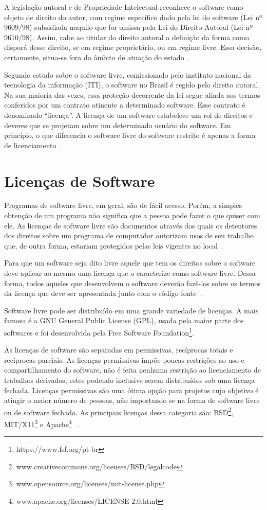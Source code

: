 A legislação autoral e de Propriedade Intelectual reconhece o software como objeto 
de direito do autor, com regime específico dado pela lei do software (Lei nº 9609/98)
subsidiada naquilo que for omissa pela Lei do Direito Autoral (Lei nº 9610/98).
%
Assim, cabe ao titular do direito autoral a definição da forma como disporá desse
direito, se em regime proprietário, ou em regime livre. Essa decisão, certamente,
situa-se fora do âmbito de atuação do estado~\cite{junior2005software}.

Segundo estudo sobre o software livre, comissionado pelo instituto nacional da 
tecnologia da informação (ITI), o software no Brasil é regido pelo direito autoral. 
Na sua maioria das vezes, essa proteção decorrente da lei segue aliada aos termos 
conferidos por um contrato atinente a determinado software. Esse contrato é 
denominado ``licença''. A licença de um software estabelece um rol de direitos e 
deveres que se projetam sobre um determinado usuário do software. Em princípio, 
o que diferencia o software livre do software restrito é apenas a forma de
licenciamento~\cite{kon2012software}.


\section{Licenças de Software}

Programas de software livre, em geral, são de fácil acesso. Porém, a simples obtenção
de um programa não significa que a pessoa pode fazer o que quiser com ele. As licenças
de software livre são documentos através dos quais os detentores dos direitos sobre um
programa de computador autorizam usos de seu trabalho que, de outra forma, estariam
protegidos pelas leis vigentes no local~\cite{sabino2009licenccas}.

Para que um software seja dito livre aquele que tem os direitos sobre o software
deve aplicar ao mesmo uma licença que o caracterize como software livre. Dessa 
forma, todos aqueles que desenvolvem o software deverão fazê-los sobre os termos
da licença que deve ser apresentada junto com o código fonte~\cite{sabino2009licenccas}.

Software livre pode ser distribuído em uma grande variedade de licenças.
A mais famosa é a GNU General Public License (GPL), usada pela maior
parte dos softwares e foi desenvolvida pela Free Software Foundation\footnote{https://www.fsf.org/pt-br}.

As licenças de software são separadas em permissivas, recíprocas totais e recíprocas
parciais.
%
As licenças permissivas impõe poucas restrições ao uso e compartilhamento do
software, não é feita nenhuma restrição ao licenciamento de trabalhos derivados, 
estes podendo inclusive serem distribuídos sob uma licença fechada. Licenças permissivas são 
uma ótima opção para projetos cujo objetivo é atingir o maior número de pessoas, 
não importando se na forma de software livre ou de software fechado. As principais 
licenças dessa categoria são: BSD\footnote{www.creativecommons.org/licenses/BSD/legalcode},
MIT/X11\footnote{www.opensource.org/licenses/mit-license.php} e Apache\footnote{www.apache.org/licenses/LICENSE-2.0.html}
~\cite{sabino2009licenccas}.

